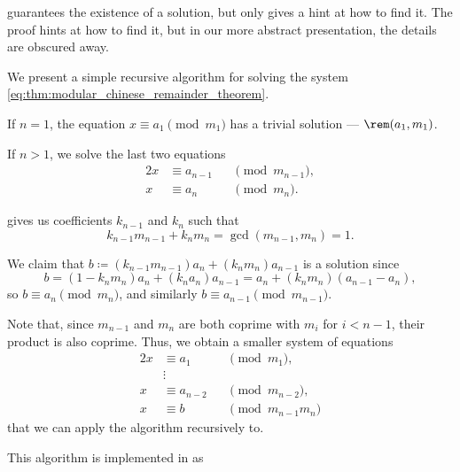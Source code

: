 \begin{algorithm}\label{alg:chinese_remainder_theorem_iteration}
   guarantees the existence of a solution, but only gives a hint at how to find it. The proof hints at how to find it, but in our more abstract presentation, the details are obscured away.

  We present a simple recursive algorithm for solving the system \eqref{eq:thm:modular_chinese_remainder_theorem}.

  \begin{thmenum}
     If \( n = 1 \), the equation \( x \equiv a_1 \pmod {m_1} \) has a trivial solution --- \( \rem(a_1, m_1) \).

     If \( n > 1 \), we solve the last two equations
    \begin{alignat*}{2}
      x &\equiv a_{n-1} &&\pmod {m_{n-1}}, \\
      x &\equiv a_n     &&\pmod {m_n}.
    \end{alignat*}

     gives us coefficients \( k_{n-1} \) and \( k_n \) such that
    \begin{equation*}
      k_{n-1} m_{n-1} + k_n m_n = \gcd(m_{n-1}, m_n) = 1.
    \end{equation*}

    We claim that \( b \coloneqq (k_{n-1} m_{n-1}) a_n + (k_n m_n) a_{n-1} \) is a solution since
    \begin{equation*}
      b = (1 - k_n m_n) a_n + (k_n a_n) a_{n-1} = a_n + (k_n m_n) (a_{n-1} - a_n),
    \end{equation*}
    so \( b \equiv a_n \pmod {m_n} \), and similarly \( b \equiv a_{n-1} \pmod {m_{n-1}} \).

    Note that, since \( m_{n-1} \) and \( m_n \) are both coprime with \( m_i \) for \( i < n - 1 \), their product is also coprime. Thus, we obtain a smaller system of equations
    \begin{alignat*}{2}
      x &\equiv a_1     &&\pmod {m_1}, \\
        &\vdots \\
      x &\equiv a_{n-2} &&\pmod {m_{n-2}}, \\
      x &\equiv b       &&\pmod {m_{n-1} m_n}
    \end{alignat*}
    that we can apply the algorithm recursively to.
  \end{thmenum}
\end{algorithm}
\begin{comments}
  \item This algorithm is implemented in \cite{notebook:code} as
  \begin{CodeRefDisplay}
  \end{CodeRefDisplay}
\end{comments}

